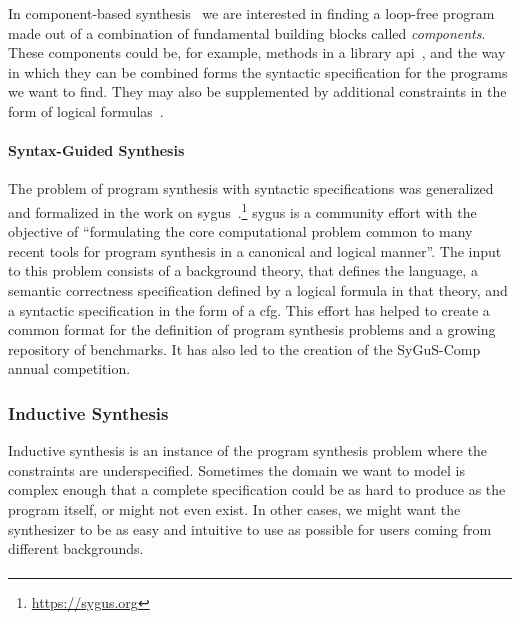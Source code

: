 In component-based
synthesis~\cite{Shi:2019:FCS,Feng:2018:PSU,Feng:2017:CST,Feng:2017:CSC,Jha:oracle:2010}
we are interested in finding a loop-free program made out of a combination of
fundamental building blocks called \textit{components}. These components could
be, for example, methods in a library
\gls{api}~\cite{Shi:2019:FCS,Feng:2017:CSC}, and the way in which they can be
combined forms the syntactic specification for the programs we want to find.
They may also be supplemented by additional constraints in the form of logical
formulas~\cite{Feng:2018:PSU}.

\paragraph{Syntax-Guided Synthesis}
\label{sec:sygus}

The problem of program synthesis with syntactic specifications was generalized
and formalized in the work on
\gls{sygus}~\cite{Alur:sygus:2013}.\footnote{\url{https://sygus.org}}
\gls{sygus} is a community effort with the objective of ``formulating the core
computational problem common to many recent tools for program synthesis in a
canonical and logical manner''.
The input to this problem consists of a background theory, that defines the
language, a semantic correctness specification defined by a logical formula in
that theory, and a syntactic specification in the form of a \gls{cfg}.
This effort has helped to create a common format for the definition of program
synthesis problems and a growing repository of benchmarks. It has also led to
the creation of the SyGuS-Comp annual competition.

\subsubsection{Inductive Synthesis}
\label{sec:inductive}

Inductive synthesis is an instance of the program synthesis problem where the
constraints are underspecified.
Sometimes the domain we want to model is complex enough that a complete
specification could be as hard to produce as the program itself, or might not
even exist.
In other cases, we might want the synthesizer to be as easy and intuitive to use
as possible for users coming from different backgrounds.

\paragraph{}

